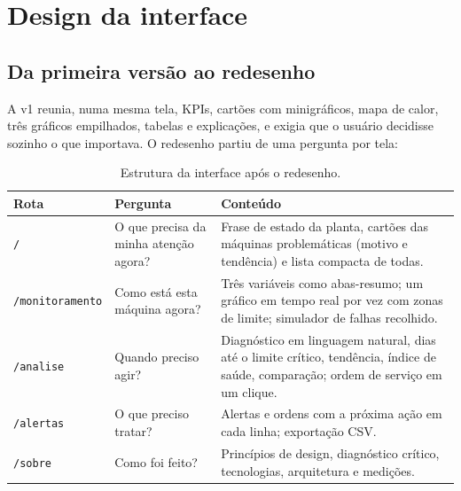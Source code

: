 \documentclass[12pt,a4paper]{article}
\newcommand{\codigo}[1]{\texttt{\small #1}}
\begin{document}
\section{Design da interface}
\label{sec:design}
\subsection{Da primeira versão ao redesenho}
A v1 reunia, numa mesma tela, KPIs, cartões com minigráficos, mapa de calor, três gráficos empilhados, tabelas e explicações, e exigia que o usuário
decidisse sozinho o que importava. O redesenho partiu de uma pergunta por tela:

\begin{table}[H]
\centering
\caption{Estrutura da interface após o redesenho.}
\label{tab:telas}
\begin{tabularx}{\textwidth}{@{}l l X@{}}
\toprule
\textbf{Rota} & \textbf{Pergunta} & \textbf{Conteúdo}\\
\midrule
\codigo{/} & O que precisa da minha atenção agora? & Frase de estado da planta, cartões das máquinas problemáticas (motivo e tendência) e lista compacta de todas.\\
\codigo{/monitoramento} & Como está esta máquina agora? & Três variáveis como abas-resumo; um gráfico em tempo real por vez com zonas de limite; simulador de falhas recolhido.\\
\codigo{/analise} & Quando preciso agir? & Diagnóstico em linguagem natural, dias até o limite crítico, tendência, índice de saúde, comparação; ordem de serviço em um clique.\\
\codigo{/alertas} & O que preciso tratar? & Alertas e ordens com a próxima ação em cada linha; exportação CSV.\\
\codigo{/sobre} & Como foi feito? & Princípios de design, diagnóstico crítico, tecnologias, arquitetura e medições.\\
\bottomrule
\end{tabularx}
\end{table}
\end{document}
